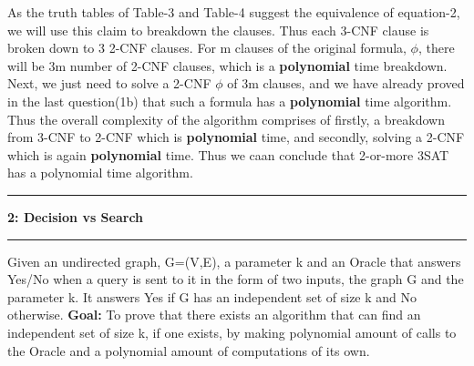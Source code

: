 \documentclass{article}
\newcommand\question[2]{\vspace{.25in}\hrule\textbf{#1: #2}\hrule\vspace{.10in}}
\begin{document}
As the truth tables of Table-3 and Table-4 suggest the equivalence of equation-2, we will use this claim to breakdown the clauses. Thus each 3-CNF clause is broken down to 3 2-CNF clauses. For m clauses of the original formula, $\phi$, there will be 3m number of 2-CNF clauses, which is a \textbf {polynomial} time breakdown. Next, we just need to solve a 2-CNF $\phi$ of 3m clauses, and we have already proved in the last question(1b) that such a formula has a \textbf {polynomial} time algorithm. \newline
Thus the overall complexity of the algorithm comprises of firstly, a breakdown from 3-CNF to 2-CNF which is \textbf {polynomial} time, and secondly, solving a 2-CNF which is again \textbf {polynomial} time. Thus we caan conclude that 2-or-more 3SAT has a polynomial time algorithm. \newline

\question{2}{Decision vs Search}
Given an undirected graph, G=(V,E), a parameter k and an Oracle that answers Yes/No when a query is sent to it in the form of two inputs, the graph G and the parameter k. It answers Yes if G has an independent set of size k and No otherwise. \newline
\textbf {Goal:} To prove that there exists an algorithm that can find an independent set of size k, if one exists, by making polynomial amount of calls to the Oracle and a polynomial amount of computations of its own. 
\end{document}
